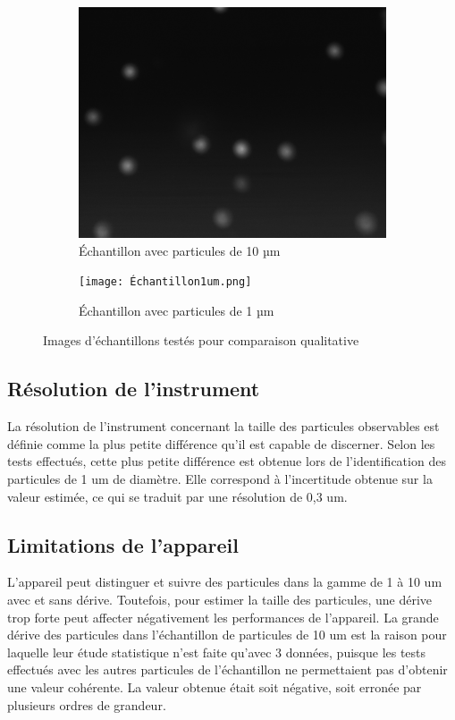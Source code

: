 \documentclass[11pt,letterpaper]{article}
\begin{document}
\begin{figure}[H]
  \begin{subfigure}[H]{0.45\textwidth}
    \centering
    \includegraphics[width=\textwidth]{essai_10um_2im_100ms.png}
    \caption{Échantillon avec particules de 10 µm}
  \end{subfigure}
  \hfill
  \begin{subfigure}[H]{0.45\textwidth}
    \centering
    \texttt{[image: Échantillon1um.png]}
    \caption{Échantillon avec particules de 1 µm}
  \end{subfigure}
  \caption{Images d'échantillons testés pour comparaison qualitative}
\end{figure}

\subsection{Résolution de l'instrument}

La résolution de l'instrument concernant la taille des particules observables est définie
comme la plus petite différence qu'il est capable de discerner. Selon les tests effectués, 
cette plus petite différence est obtenue lors de l'identification des particules de 1 um 
de diamètre. Elle correspond à l'incertitude obtenue sur la valeur estimée, ce qui se traduit
par une résolution de 0,3 um. 

\subsection{Limitations de l'appareil}

L'appareil peut distinguer et suivre des particules dans la gamme de 1 à 10 um avec et sans dérive.
Toutefois, pour estimer la taille des particules, une dérive trop forte peut affecter négativement 
les performances de l'appareil. La grande dérive des particules dans l'échantillon de particules 
de 10 um est la raison pour laquelle leur étude statistique n'est faite qu'avec 3 données, puisque 
les tests effectués avec les autres particules de l'échantillon ne permettaient pas d'obtenir une 
valeur cohérente. La valeur obtenue était soit négative, soit erronée par plusieurs ordres de grandeur.
\end{document}
